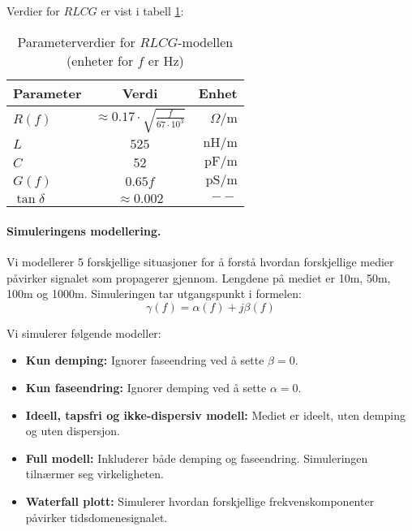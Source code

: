 \noindent Verdier for $RLCG$ er vist i tabell \ref{tab:parameters}: \\
\begin{table}[htbp] %
    \centering %
    
    \label{tab:my_table} %

    \begin{tabular}{l c r} %
        \toprule %
        Parameter & Verdi & Enhet\\ %
        \midrule %
         $R(f)$ & $\approx 0.17 \cdot \sqrt{\frac{f}{67 \cdot 10^3}}$ &  $\Omega / \mathrm{m}$ \\[.3em]
         $L$ & $525$ & $\mathrm{nH/m}$ \\[.3em]
         $C$ & $52$ & $\mathrm{pF/m}$ \\[.3em]
         $G(f)$ & $0.65f$ &  $\mathrm{pS/m}$ \\[.3em]
         $\tan \delta$ & $\approx 0.002$ &  $--$ \\[.3em]
        \bottomrule %
    \end{tabular}
    \caption{Parameterverdier for $RLCG$-modellen (enheter for $f$ er Hz)} %
    \label{tab:parameters} %
\end{table}
\paragraph{Simuleringens modellering.}
Vi modellerer 5 forskjellige situasjoner for å forstå hvordan forskjellige medier påvirker signalet som propagerer gjennom. Lengdene på mediet er 10m, 50m, 100m og 1000m. Simuleringen tar utgangspunkt i formelen:
\[
\gamma (f) = \alpha(f) + j\beta(f)
\]

\noindent Vi simulerer følgende modeller:\\
\begin{itemize}
    \item \textbf{Kun demping:} Ignorer faseendring ved å sette $\beta = 0$.\\
    \item \textbf{Kun faseendring:} Ignorer demping ved å sette $\alpha = 0$.\\
    \item \textbf{Ideell, tapsfri og ikke-dispersiv modell:} Mediet er ideelt, uten demping og uten dispersjon.\\
    \item \textbf{Full modell:} Inkluderer både demping og faseendring. Simuleringen tilnærmer seg virkeligheten.\\
    \item \textbf{Waterfall plott:} Simulerer hvordan forskjellige frekvenskomponenter påvirker tidsdomenesignalet.\\
\end{itemize}

